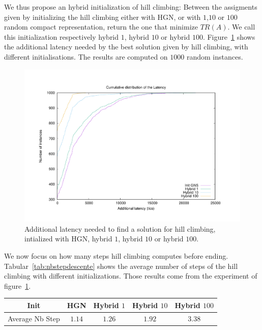\documentclass[english]{article}
\begin{document}
We thus propose an hybrid initialization of hill climbing: Between the assigments given by initializing the hill climbing either with HGN, or with $1$,$10$ or $100$ random compact representation, return the one that minimize $TR(A)$. We call this initialization respectively hybrid $1$, hybrid $10$ or hybrid $100$.
Figure~\ref{fig:hybridhill} shows the additional latency needed by the best solution given by hill climbing, with different initialisations. The results are computed on $1000$ random instances.
\begin{figure}[h]
	\centering
	\includegraphics[scale=0.3]{hybridhill}
\caption{ Additional latency needed to find a solution for hill climbing, intialized with HGN, hybrid $1$, hybrid $10$ or hybrid $100$.}
\label{fig:hybridhill}
\end{figure}

We now focus on how many steps hill climbing computes before ending. Tabular~\ref{tab:nbstepdescente} shows the average number of steps of the hill climbing with different initializations. Those results come from the experiment of figure~\ref{fig:hybridhill}.

\begin{tabular}{ |c|c|c|c|c| }
\hline
    Init & HGN& Hybrid $1$& Hybrid $10$& Hybrid $100$\\
    \hline
    Average Nb Step & $1.14$ & $1.26$& $1.92$&$3.38$ \\

    \hline
 \end{tabular}
 \label{tab:nbstepdescente}
\end{document}
